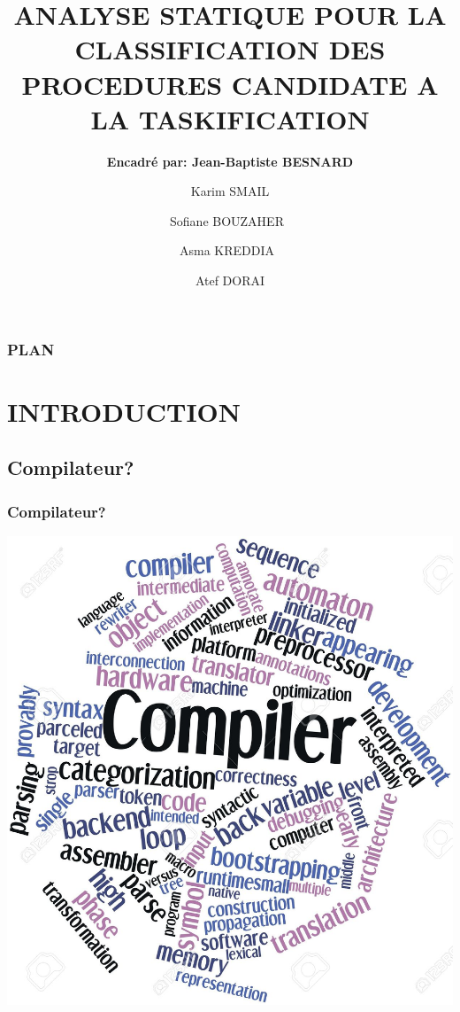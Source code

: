 \documentclass[hyperref={bookmarks=false},aspectratio=169]{beamer}
\title[]
{\bfseries{ANALYSE STATIQUE POUR LA CLASSIFICATION DES PROCEDURES CANDIDATE A LA TASKIFICATION}}
\author[]
{ \textbf{Encadré par: Jean-Baptiste BESNARD}\\  \and Karim SMAIL \and Sofiane BOUZAHER\ \and Asma KREDDIA\ \and Atef DORAI }
\institute
{
   Master CHPS 
   \\ \url{https://github.com/Taskification/Taskification}
}
\begin{document}


\frame{\titlepage}  %

\begin{frame}
\frametitle{PLAN}
\tableofcontents
\end{frame}

\section{INTRODUCTION}


\subsection{Compilateur?}



\begin{frame}
\frametitle{Compilateur?}

\vfill
\begin{center} \includegraphics[scale=0.9]{./figures/COMPILATEUR.jpg} \\[1cm] \end{center}
\vfill


\end{frame}
\end{document}
